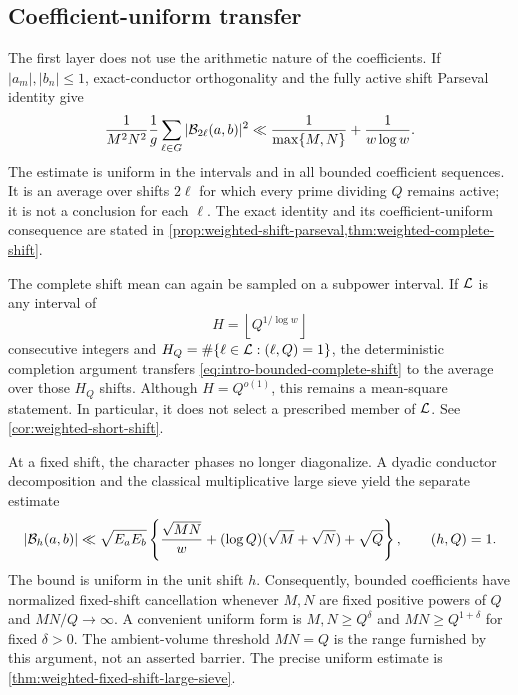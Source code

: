\subsection{Coefficient-uniform transfer}

The first layer does not use the arithmetic nature of the coefficients.  If
$|a_m|,|b_n|\le1$, exact-conductor orthogonality and the fully active shift
Parseval identity give
\begin{equation}\label{eq:intro-bounded-complete-shift}
 \frac1{M^2N^2}
 \frac1g\sum_{\ell\in G}|\mathcal B_{2\ell}(a,b)|^2
 \ll
 \frac1{\max\{M,N\}}+\frac1{w\log w}.
\end{equation}
The estimate is uniform in the intervals and in all bounded coefficient
sequences.  It is an average over shifts $2\ell$ for which every prime
dividing $Q$ remains active; it is not a conclusion for each $\ell$.
The exact identity and its coefficient-uniform consequence are stated in
\cref{prop:weighted-shift-parseval,thm:weighted-complete-shift}.

The complete shift mean can again be sampled on a subpower interval.  If
$\mathcal L$ is any interval of
\begin{equation}\label{eq:intro-subpower-shift-length}
 H=\left\lfloor Q^{1/\log w}\right\rfloor
\end{equation}
consecutive integers and
$H_Q=\#\{\ell\in\mathcal L:(\ell,Q)=1\}$, the deterministic completion argument
transfers \eqref{eq:intro-bounded-complete-shift} to the average over those
$H_Q$ shifts.  Although $H=Q^{o(1)}$, this remains a mean-square statement.
In particular, it does not select a prescribed member of $\mathcal L$.
See \cref{cor:weighted-short-shift}.

At a fixed shift, the character phases no longer diagonalize.  A dyadic
conductor decomposition and the classical multiplicative large sieve yield
the separate estimate
\begin{equation}\label{eq:intro-weighted-fixed-shift}
 |\mathcal B_h(a,b)|
 \ll
 \sqrt{E_aE_b}
 \left\{
  \frac{\sqrt{MN}}w
  +(\log Q)(\sqrt M+\sqrt N)
  +\sqrt Q
 \right\},
 \qquad (h,Q)=1.
\end{equation}
The bound is uniform in the unit shift $h$.  Consequently, bounded
coefficients have normalized fixed-shift cancellation whenever $M,N$ are
fixed positive powers of $Q$ and $MN/Q\to\infty$.  A convenient uniform
form is $M,N\ge Q^\delta$ and $MN\ge Q^{1+\delta}$ for fixed $\delta>0$.
The ambient-volume threshold $MN=Q$ is the range furnished by this argument,
not an asserted barrier.  The precise uniform estimate is
\cref{thm:weighted-fixed-shift-large-sieve}.

